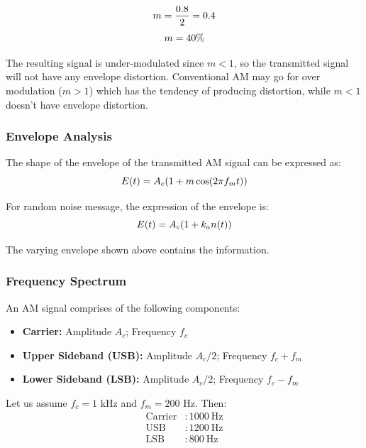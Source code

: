 \documentclass[12pt,a4paper]{report}
\begin{document}
	\begingroup
	\setlength{\mathindent}{0pt}
	\begin{equation*}
		\hfill
		m = \frac{0.8}{2} = 0.4
		\hfill
	\end{equation*}
	\endgroup
	\begingroup
	\setlength{\mathindent}{0pt}
	\begin{equation*}
		\hfill
		m = 40\%
		\hfill
	\end{equation*}
	\endgroup
	
	The resulting signal is under-modulated since $m < 1$, so the transmitted signal will not have any envelope distortion. Conventional AM may go for over modulation ($m > 1$) which has the tendency of producing distortion, while $m < 1$ doesn't have envelope distortion.
	
	\subsubsection{Envelope Analysis}
	The shape of the envelope of the transmitted AM signal can be expressed as:
	\begingroup
	\setlength{\mathindent}{0pt}
	\begin{equation*}
		\hfill
		E(t) = A_c (1 + m \cos(2\pi f_m t))
		\hfill
	\end{equation*}
	\endgroup
	
	For random noise message, the expression of the envelope is:
	\begingroup
	\setlength{\mathindent}{0pt}
	\begin{equation*}
		\hfill
		E(t) = A_c (1 + k_a n(t))
		\hfill
	\end{equation*}
	\endgroup
	
	The varying envelope shown above contains the information.
	
	\subsubsection{Frequency Spectrum}
	An AM signal comprises of the following components:
	\begin{itemize}
		\item \textbf{Carrier:} Amplitude $A_c$; Frequency $f_c$
		\item \textbf{Upper Sideband (USB):} Amplitude $A_c/2$; Frequency $f_c + f_m$
		\item \textbf{Lower Sideband (LSB):} Amplitude $A_c/2$; Frequency $f_c - f_m$
	\end{itemize}
	
	Let us assume $f_c = 1$ kHz and $f_m = 200$ Hz. Then:
	\begin{align*}
		\text{Carrier} &: 1000\ \text{Hz} \\
		\text{USB} &: 1200\ \text{Hz} \\
		\text{LSB} &: 800\ \text{Hz}
	\end{align*}
	
\end{document}
